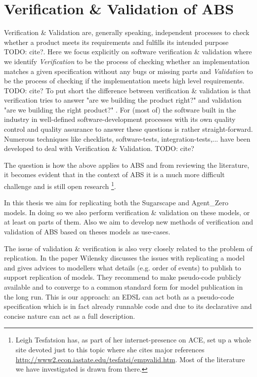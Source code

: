 \section{Verification \& Validation of ABS}
Verification \& Validation are, generally speaking, independent processes to check whether a product meets its requirements and fulfills its intended purpose TODO: cite?. Here we focus explicitly on software verification \& validation where we identify \textit{Verification} to be the process of checking whether an implementation matches a given specification without any bugs or missing parts and \textit{Validation} to be the process of checking if the implementation meets high level requirements. TODO: cite?
To put short the difference between verification \& validation is that verification tries to answer "are we building the product right?" and validation "are we building the right product?" \cite{boehm_software_1989}. For (most of) the software built in the industry in well-defined software-development processes with its own quality control and quality assurance to answer these questions is rather straight-forward. Numerous techniques like checklists, software-tests, integration-tests,... have been developed to deal with Verification \& Validation. TODO: cite?

The question is how the above applies to ABS and from reviewing the literature, it becomes evident that in the context of ABS it is a much more difficult challenge and is still open research \footnote{Leigh Tesfatsion has, as part of her internet-presence on ACE, set up a whole site devoted just to this topic where she cites major references \url{http://www2.econ.iastate.edu/tesfatsi/empvalid.htm}. Most of the literature we have investigated  is drawn from there.}. 

In this thesis we aim for replicating both the Sugarscape \cite{epstein_growing_1996} and Agent\_Zero \cite{epstein_agent_zero:_2014} models. In doing so we also perform verification \& validation on these models, or at least on parts of them. Also we aim to develop new methods of verification and validation of ABS based on theses models as use-cases. 

The issue of validation \& verification is also very closely related to the problem of replication. In the paper \cite{wilensky_making_2007} Wilensky discusses the issues with replicating a model and gives advices to modellers what details (e.g. order of events) to publish to support replication of models. They recommend to make pseudo-code publicly available and to converge to a common standard form for model publication in the long run. This is our approach: an EDSL can act both as a pseudo-code specification which is in fact already runnable code and due to its declarative and concise nature can act as a full description.
 
